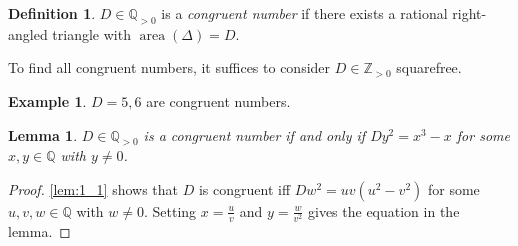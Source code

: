 \documentclass[11pt]{article}
\theoremstyle{definition}
\newtheorem*{definition*}{Definition}
\newtheorem*{example*}{Example}
\theoremstyle{plain}
\newtheorem{lemma}[definition]{Lemma}
\theoremstyle{remark}
\DeclareMathOperator{\area}{area}
\newcommand{\ZZ}{\mathbb{Z}}
\newcommand{\QQ}{\mathbb{Q}}
\begin{document}
\begin{definition*}
    $D \in \QQ_{> 0}$ is a \emph{congruent number} if there exists a rational right-angled triangle with $\area(\Delta) = D$.
\end{definition*}

\noindent To find all congruent numbers, it suffices to consider $D \in \ZZ_{>0}$ squarefree.

\begin{example*}
    $D = 5, 6$ are congruent numbers.
\end{example*}

\begin{lemma}\label{lem:1_2}
    $D \in \QQ_{> 0}$ is a congruent number if and only if $D y^2 = x^3 - x$ for some $x, y \in \QQ$ with $y \neq 0$.
\end{lemma}
\begin{proof}
    \autoref{lem:1_1} shows that $D$ is congruent iff $D w^2 = u v (u^2 - v^2)$ for some $u, v, w \in \QQ$ with $w \neq 0$. Setting $x =\frac{u}{v}$ and $y = \frac{w}{v^2}$ gives the equation in the lemma.
\end{proof}
\end{document}
